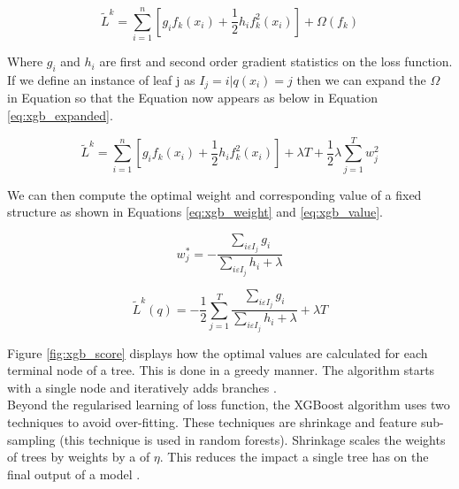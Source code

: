 \vspace{10pt}

\begin{equation} \label{eq:xgb_second}
\tilde{L}^{k} = \sum_{i=1}^{n}[g_i f_k(x_i) + \dfrac{1}{2} h_i f^{2}_{k}(x_i)] + \Omega(f_k)
\end{equation}

\vspace{10pt}

Where $g_i$ and $h_i$ are first and second order gradient statistics on the loss function. If we define an instance of leaf j as $I_j = {i|q(x_i) = j}$ then we can expand the $\Omega$ in Equation \label{eq:xgb_second} so that the Equation now appears as below in Equation \ref{eq:xgb_expanded}. 

\begin{equation} \label{eq:xgb_expanded}
\tilde{L}^{k} = \sum_{i=1}^{n}[g_i f_k(x_i) + \dfrac{1}{2} h_i f^{2}_{k}(x_i)] + \lambda T + \dfrac{1}{2} \lambda \sum_{j=1}^{T} w^{2}_{j}
\end{equation}

\vspace{10pt}

We can then compute the optimal weight and corresponding value of a fixed structure as shown in Equations \ref{eq:xgb_weight} and \ref{eq:xgb_value}. 

\vspace{10pt}

\begin{equation} \label{eq:xgb_weight}
w^{*}_{j} = - \dfrac{\sum_{i \varepsilon I_{j}} g_i}{\sum_{i \varepsilon I_{j}} h_i + \lambda}
\end{equation}

\vspace{10pt}

\begin{equation} \label{eq:xgb_value}
\tilde{L}^{k}(q) = - \dfrac{1}{2} \sum_{j=1}^{T} \dfrac{\sum_{i \varepsilon I_{j}} g_i}{\sum_{i \varepsilon I_{j}} h_i + \lambda} + \lambda T
\end{equation}

\vspace{10pt}

Figure \ref{fig:xgb_score} displays how the optimal values are calculated for each terminal node of a tree. This is done in a greedy manner. The algorithm starts with a single node and iteratively adds branches \parencite{XGBoost}.\\

Beyond the regularised learning of loss function, the XGBoost algorithm uses two techniques to avoid over-fitting. These techniques are shrinkage and feature sub-sampling (this technique is used in random forests). Shrinkage scales the weights of trees by weights by a of $\eta$. This reduces the impact a single tree has on the final output of a model \parencite{Shrinkage}. \newpage

